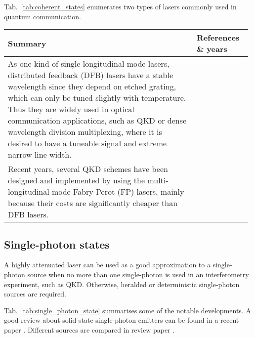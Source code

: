 Tab.~\ref{tab:coherent_states} enumerates two types of lasers commonly used in quantum communication.
 
\begin{table*}[!htbp]
	\begin{tabular}{|p{0.755\linewidth}|p{0.22\linewidth}|}
		\hline
		Summary & References \& years \\
		\hline \hline
		 As one kind of single-longitudinal-mode lasers, distributed feedback (DFB) lasers have a stable wavelength since they depend on etched grating, which can only be tuned slightly with temperature. Thus they are widely used in optical communication applications, such as QKD or dense wavelength division multiplexing, where it is desired to have a tuneable signal and extreme narrow line width. & \cite{bib:sun2016quantum, bib:liao2017long} \\
		\hline
		 Recent years, several QKD schemes have been designed and implemented by using the multi-longitudinal-mode Fabry-Perot (FP) lasers, mainly because their costs are significantly cheaper than DFB lasers. &  \cite{bib:choi2011quantum,  bib:wang2015experimental} \\
        \hline
	\end{tabular}
	\captionspacetab \caption{Two types of lasers commonly used in quantum communication} \label{tab:coherent_states}
\end{table*}

%
%

\subsection{Single-photon states} 

A highly attenuated laser can be used as a good approximation to a single-photon source when no more than one single-photon is used in an interferometry experiment, such as QKD. Otherwise, heralded or deterministic single-photon sources are required.

Tab.~\ref{tab:single_photon_state} summarises some of the notable developments. A good review about solid-state single-photon emitters can be found in a recent paper \cite{bib:aharonovich2016solid}. Different sources are compared in review paper \cite{bib:eisaman2011}.

